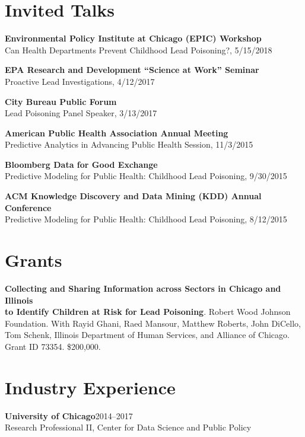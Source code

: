 \documentclass[margin,line]{resume}
\begin{document}
\begin{resume}
	\section{\mysidestyle Invited Talks}
        
	{\bf Environmental Policy Institute at Chicago (EPIC) Workshop} \\
        Can Health Departments Prevent Childhood Lead Poisoning?, 5/15/2018

	{\bf EPA Research and Development ``Science at Work'' Seminar} \\
        Proactive Lead Investigations, 4/12/2017

	{\bf City Bureau Public Forum} \\
        Lead Poisoning Panel Speaker, 3/13/2017 

	{\bf American Public Health Association Annual Meeting} \\
    Predictive Analytics in Advancing Public Health Session, 11/3/2015 

	{\bf Bloomberg Data for Good Exchange} \\
        Predictive Modeling for Public Health: Childhood Lead Poisoning, 9/30/2015 

    {\bf ACM Knowledge Discovery and Data Mining (KDD) Annual Conference} \\
        Predictive Modeling for Public Health: Childhood Lead Poisoning, 8/12/2015

	\section{\mysidestyle Grants}
        {\bf Collecting and Sharing Information across Sectors in Chicago and Illinois\\ to Identify Children at Risk for Lead Poisoning}. Robert Wood Johnson\\ Foundation. With Rayid Ghani, Raed Mansour, Matthew Roberts, John DiCello,\\ Tom Schenk,  Illinois Department of Human Services, and Alliance of Chicago.\\ Grant ID 73354. \$200,000. \\

        \section{\mysidestyle Industry Experience}
	{\bf University of Chicago}\hfill{2014--2017}\\
	Research Professional II, Center for Data Science and Public Policy


\end{resume}
\end{document}
